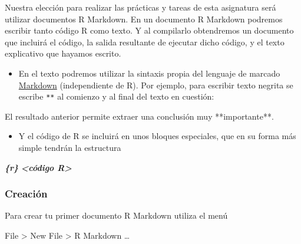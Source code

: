 \documentclass[
  title=normal,
  notoc,
  bib=normal]{mnye}
\newenvironment{Shaded}{\begin{snugshade}}{\end{snugshade}}
\newcommand{\InformationTok}[1]{\textcolor[rgb]{0.56,0.35,0.01}{\textbf{\textit{#1}}}}
\newcommand{\NormalTok}[1]{#1}
\providecommand{\tightlist}{%
  \setlength{\itemsep}{0pt}\setlength{\parskip}{0pt}}
\begin{document}
Nuestra elección para realizar las prácticas y tareas de esta asignatura será utilizar documentos R Markdown. En un documento R Markdown podremos escribir tanto código \textsf{R} como texto. Y al compilarlo obtendremos un documento que incluirá el código, la salida resultante de ejecutar dicho código, y el texto explicativo que hayamos escrito.

\begin{itemize}
\tightlist
\item
  En el texto podremos utilizar la sintaxis propia del lenguaje de marcado \href{https://es.wikipedia.org/wiki/Markdown}{Markdown} (independiente de \textsf{R}). Por ejemplo, para escribir texto negrita se escribe \texttt{**} al comienzo y al final del texto en cuestión:
\end{itemize}

\begin{Shaded}
\begin{Highlighting}[]
\NormalTok{El resultado anterior permite extraer una conclusión muy **importante**.}
\end{Highlighting}
\end{Shaded}

\begin{itemize}
\tightlist
\item
  Y el código de \textsf{R} se incluirá en unos bloques especiales, que en su forma más simple tendrán la estructura
\end{itemize}

\begin{Shaded}
\begin{Highlighting}[]
\InformationTok{\textasciigrave{}\textasciigrave{}\textasciigrave{}\{r\}}
\InformationTok{\textless{}código R\textgreater{}}
\InformationTok{\textasciigrave{}\textasciigrave{}\textasciigrave{}}
\end{Highlighting}
\end{Shaded}

\hypertarget{creaciuxf3n-1}{%
\subsubsection{Creación}\label{creaciuxf3n-1}}

Para crear tu primer documento R Markdown utiliza el menú

\begin{menu}
File \textgreater{} New File \textgreater{} R Markdown \ldots{}

\end{menu}
\end{document}

